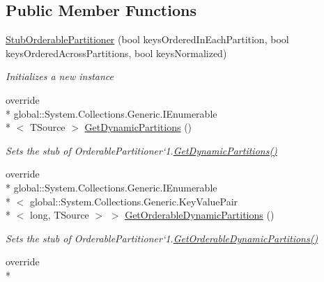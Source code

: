 \subsection*{Public Member Functions}
\begin{DoxyCompactItemize}
\item 
\hyperlink{class_system_1_1_collections_1_1_concurrent_1_1_fakes_1_1_stub_orderable_partitioner_3_01_t_source_01_4_af7175a9c7f1210f8df538cad8ef545c2}{Stub\-Orderable\-Partitioner} (bool keys\-Ordered\-In\-Each\-Partition, bool keys\-Ordered\-Across\-Partitions, bool keys\-Normalized)
\begin{DoxyCompactList}\small\item\em Initializes a new instance\end{DoxyCompactList}\item 
override \\*
global\-::\-System.\-Collections.\-Generic.\-I\-Enumerable\\*
$<$ T\-Source $>$ \hyperlink{class_system_1_1_collections_1_1_concurrent_1_1_fakes_1_1_stub_orderable_partitioner_3_01_t_source_01_4_a5bf081b6944021eb3f37783d45302a69}{Get\-Dynamic\-Partitions} ()
\begin{DoxyCompactList}\small\item\em Sets the stub of Orderable\-Partitioner`1.\hyperlink{class_system_1_1_collections_1_1_concurrent_1_1_fakes_1_1_stub_orderable_partitioner_3_01_t_source_01_4_a5bf081b6944021eb3f37783d45302a69}{Get\-Dynamic\-Partitions()}\end{DoxyCompactList}\item 
override \\*
global\-::\-System.\-Collections.\-Generic.\-I\-Enumerable\\*
$<$ global\-::\-System.\-Collections.\-Generic.\-Key\-Value\-Pair\\*
$<$ long, T\-Source $>$ $>$ \hyperlink{class_system_1_1_collections_1_1_concurrent_1_1_fakes_1_1_stub_orderable_partitioner_3_01_t_source_01_4_ad3e506844616c71ccf5baefe68477c1f}{Get\-Orderable\-Dynamic\-Partitions} ()
\begin{DoxyCompactList}\small\item\em Sets the stub of Orderable\-Partitioner`1.\hyperlink{class_system_1_1_collections_1_1_concurrent_1_1_fakes_1_1_stub_orderable_partitioner_3_01_t_source_01_4_ad3e506844616c71ccf5baefe68477c1f}{Get\-Orderable\-Dynamic\-Partitions()}\end{DoxyCompactList}\item 
override \\*

\end{DoxyCompactItemize}
